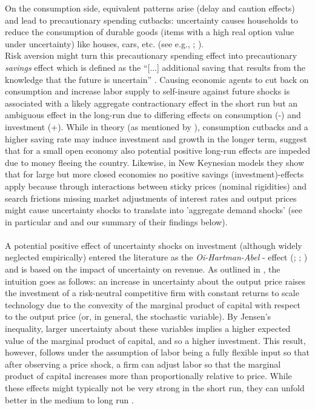 \documentclass[a4paper,11pt,listof=nochaptergap,oneside,pointednumbers,bibtotoc,bigheadings,liststotoc]{scrbook}
\theoremstyle{mysatz}
\theoremstyle{mydefinition}
\theoremstyle{mybemerkung}
\begin{document}
On the consumption side, equivalent patterns arise (delay and caution effects) and lead to precautionary spending cutbacks: uncertainty causes households to reduce the consumption of durable goods (items with a high real option value under uncertainty) like houses, cars, etc. (see e.g., \citealp{eberly:94}; \citealp{romer:90}).\\
Risk aversion might turn this precautionary spending effect into precautionary \textit{savings} effect which is defined as the ``[...] additional saving that results from the knowledge that the future is uncertain'' \citep[p. 2]{carrollandkimball:06}. Causing economic agents to cut back on consumption and increase labor supply to self-insure against future shocks is associated with a likely aggregate contractionary effect in the short run but an ambiguous effect in the long-run due to differing effects on consumption (-) and investment (+). While in theory (as mentioned by \citealp{bloom:14}), consumption cutbacks and a higher saving rate may induce investment and growth in the longer term, \citet{villaverdeetal:11} suggest that for a small open economy also potential positive long-run effects are impeded due to money fleeing the country. Likewise, in New Keynesian models they show that for large but more closed economies no positive savings (investment)-effects apply because through interactions between sticky prices (nominal rigidities) and search frictions missing market adjustments of interest rates and output prices might cause uncertainty shocks to translate into 'aggregate demand shocks' (see in particular \citealp{leducandliu:16} and \citealp{basuandbundick:17} and our summary of their findings below).\\
\\
A potential positive effect of uncertainty shocks on investment (although widely neglected empirically) entered the literature as the \textit{Oi-Hartman-Abel} - effect (\citealp{oi:61}; \citealp{hartman:72}; \citealp{abel:83}) and is based on the impact of uncertainty on revenue. As outlined in \citet{saltarietal:kA}, the intuition goes as follows: an increase in uncertainty about the output price raises the investment of a risk-neutral competitive firm with constant returns to scale technology due to the convexity of the marginal product of capital with respect to the output price (or, in general, the stochastic variable). By Jensen’s inequality, larger uncertainty about these variables implies a higher expected value of the marginal product of capital, and so a higher investment. This result, however, follows under the assumption of labor being a fully flexible input so that after observing a price shock, a firm can adjust labor so that the marginal product of capital increases more than proportionally relative to price. While these effects might typically not be very strong in the short run, they can unfold better in the medium to long run \citep{bloom:14}.
\end{document}

